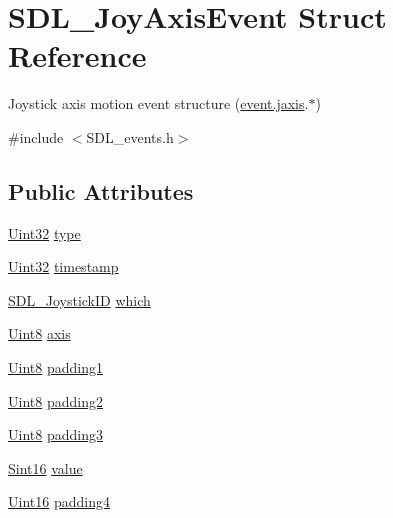 \hypertarget{struct_s_d_l___joy_axis_event}{}\section{S\+D\+L\+\_\+\+Joy\+Axis\+Event Struct Reference}
\label{struct_s_d_l___joy_axis_event}


Joystick axis motion event structure (\hyperlink{union_s_d_l___event_ac4611acd0e9c675e67dc20919f0accb4}{event.\+jaxis}.$\ast$)  




{\ttfamily \#include $<$S\+D\+L\+\_\+events.\+h$>$}

\subsection*{Public Attributes}
\begin{DoxyCompactItemize}
\item 
\hyperlink{_s_d_l__stdinc_8h_add440eff171ea5f55cb00c4a9ab8672d}{Uint32} \hyperlink{struct_s_d_l___joy_axis_event_aed1c873fb90ba58194e65f972933c67d}{type}
\item 
\hyperlink{_s_d_l__stdinc_8h_add440eff171ea5f55cb00c4a9ab8672d}{Uint32} \hyperlink{struct_s_d_l___joy_axis_event_a60ecfc70df9eeef8e33b5dd7dc060389}{timestamp}
\item 
\hyperlink{_s_d_l__joystick_8h_a3c3d32500cb08f76ee8077983912c0bd}{S\+D\+L\+\_\+\+Joystick\+ID} \hyperlink{struct_s_d_l___joy_axis_event_a965719f4703a7091bcc5f07f79fcf7e1}{which}
\item 
\hyperlink{_s_d_l__stdinc_8h_a2944638813a090aa23e62f4da842c3e2}{Uint8} \hyperlink{struct_s_d_l___joy_axis_event_a0beac2fb161e45771c424bd0b6daeabb}{axis}
\item 
\hyperlink{_s_d_l__stdinc_8h_a2944638813a090aa23e62f4da842c3e2}{Uint8} \hyperlink{struct_s_d_l___joy_axis_event_ae8e17bced478530638982f0382a0dafa}{padding1}
\item 
\hyperlink{_s_d_l__stdinc_8h_a2944638813a090aa23e62f4da842c3e2}{Uint8} \hyperlink{struct_s_d_l___joy_axis_event_ad5407250032f618fde7437ac5f229257}{padding2}
\item 
\hyperlink{_s_d_l__stdinc_8h_a2944638813a090aa23e62f4da842c3e2}{Uint8} \hyperlink{struct_s_d_l___joy_axis_event_a8bf5144fddc19686c2003add1f0e1565}{padding3}
\item 
\hyperlink{_s_d_l__stdinc_8h_a9d0257032c0e146ab6121bf0122712f5}{Sint16} \hyperlink{struct_s_d_l___joy_axis_event_a53ee73e7c367934dd6edb69963be5556}{value}
\item 
\hyperlink{_s_d_l__stdinc_8h_a31fcc0a076c9068668173ee26d33e42b}{Uint16} \hyperlink{struct_s_d_l___joy_axis_event_a604b258940a8cd8beaa5efeb55d6f825}{padding4}
\end{DoxyCompactItemize}


